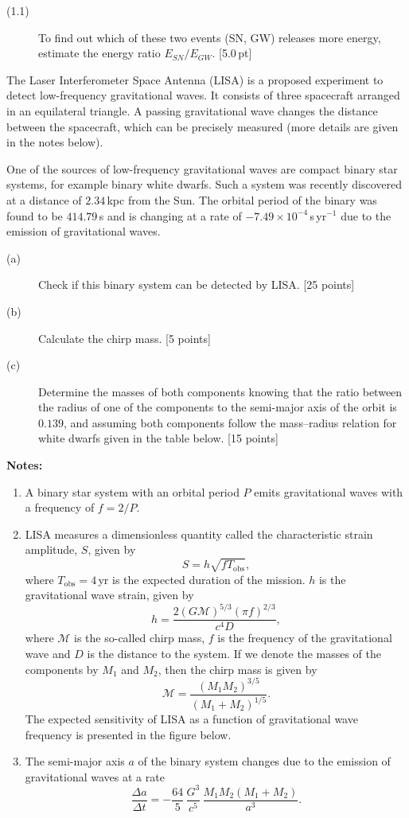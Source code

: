 \begin{description}
\item[(1.1)] To find out which of these two events (SN, GW) releases more
  energy, estimate the energy ratio $E_{SN}/E_{GW}$. \hfill[5.0\,pt]
\end{description}

The Laser Interferometer Space Antenna (LISA) is a proposed experiment to detect
low-frequency gravitational waves. It consists of three spacecraft arranged in
an equilateral triangle. A passing gravitational wave changes the distance
between the spacecraft, which can be precisely measured (more details are given
in the notes below).

One of the sources of low-frequency gravitational waves are compact binary star
systems, for example binary white dwarfs. Such a system was recently discovered
at a distance of $2.34$\,kpc from the Sun. The orbital period of the binary was
found to be $414.79$\,s and is changing at a rate of
$-7.49 \times 10^{-4}$\,s\,yr$^{-1}$ due to the emission of gravitational waves.

\begin{description}
\item[(a)] Check if this binary system can be detected by LISA. \hfill[25 points]
\item[(b)] Calculate the chirp mass. \hfill[5 points]
\item[(c)] Determine the masses of both components knowing that the ratio
  between the radius of one of the components to the semi-major axis of the
  orbit is $0.139$, and assuming both components follow the mass--radius
  relation for white dwarfs given in the table below. \hfill[15 points]
\end{description}

\noindent\textbf{Notes:}
\begin{enumerate}
\item A binary star system with an orbital period $P$ emits gravitational waves
  with a frequency of $f = 2/P$.
\item LISA measures a dimensionless quantity called the characteristic strain
  amplitude, $S$, given by
  \[ S = h\sqrt{f T_{\mathrm{obs}}}, \]
  where $T_{\mathrm{obs}} = 4$\,yr is the expected duration of the mission. $h$
  is the gravitational wave strain, given by
  \[ h = \frac{2(G\mathcal{M})^{5/3}(\pi f)^{2/3}}{c^4 D}, \]
  where $\mathcal{M}$ is the so-called chirp mass, $f$ is the frequency of the
  gravitational wave and $D$ is the distance to the system. If we denote the
  masses of the components by $M_1$ and $M_2$, then the chirp mass is given by
  \[ \mathcal{M} = \frac{(M_1 M_2)^{3/5}}{(M_1 + M_2)^{1/5}}. \]
  The expected sensitivity of LISA as a function of gravitational wave
  frequency is presented in the figure below.
\item The semi-major axis $a$ of the binary system changes due to the emission
  of gravitational waves at a rate
  \[ \frac{\Delta a}{\Delta t} = -\frac{64}{5}\,\frac{G^3}{c^5}\,
     \frac{M_1 M_2 (M_1 + M_2)}{a^3}. \]
\end{enumerate}


